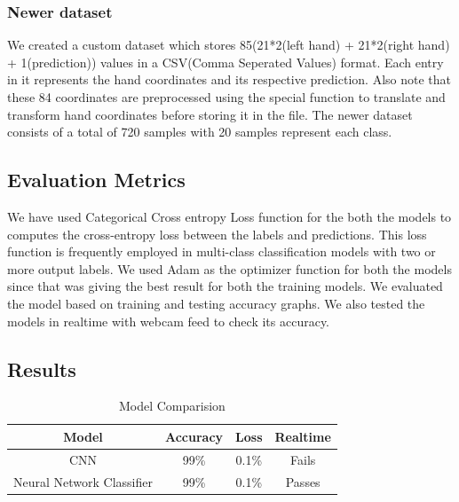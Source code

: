 \documentclass[12pt,a4paper]{report}
\begin{document}
\subsubsection{Newer dataset}
We created a custom dataset which stores 85(21*2(left hand) + 21*2(right hand) + 1(prediction)) values in a CSV(Comma Seperated Values) format. Each entry in it represents the hand coordinates and its respective prediction. Also note that these 84 coordinates are preprocessed using the special function to translate and transform hand coordinates before storing it in the file. The newer dataset consists of a total of 720 samples with 20 samples represent each class.

\subsection{Evaluation Metrics}
We have used Categorical Cross entropy Loss function for the both the models to computes the cross-entropy loss between the labels and predictions. This loss function is frequently employed in multi-class classification models with two or more output labels. We used Adam as the optimizer function for both the models since that was giving the best result for both the training models. We evaluated the model based on training and testing accuracy graphs. We also tested the models in realtime with webcam feed to check its accuracy.

\subsection{Results}
\begin{table}[h]
	\centering
	\begin{tabular}{ | c | c | c | c | }
		\hline
		Model                     & Accuracy & Loss  & Realtime \\
		\hline
		CNN                       & 99\%     & 0.1\% & Fails    \\
		Neural Network Classifier & 99\%     & 0.1\% & Passes   \\
		\hline
	\end{tabular}
	\caption{Model Comparision}
\end{table}
\end{document}

